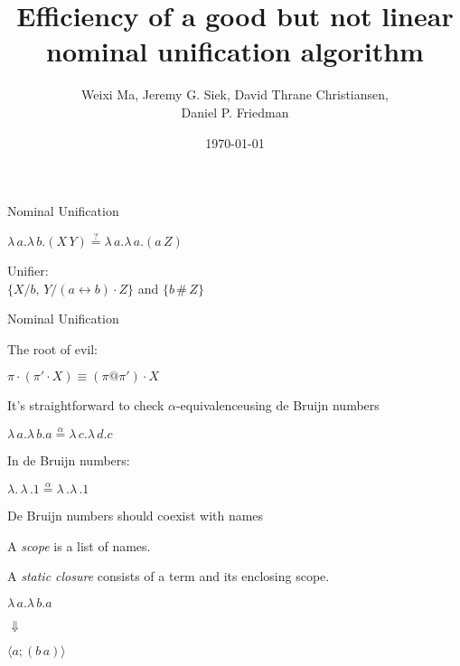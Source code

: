 \documentclass[pdf]{beamer}
\date{\today}
\title{Efficiency of a good but not linear nominal unification algorithm}
\author{Weixi Ma, Jeremy G. Siek, David Thrane Christiansen,\\ Daniel P. Friedman}
\newcommand{\bd}[2] {
 #1/ #2
}
\newcommand{\clos}[2] {
\langle #1; #2 \rangle
}
\newcommand{\swap}[2] {
  #1\leftrightarrow#2
}
\newcommand{\alphaeq}[2] {
  #1\stackrel{\alpha}{=}#2
}
\begin{document}


\begin{frame}
  \maketitle
\end{frame}

\begin{frame}{Nominal Unification~\citep{urban_nominal_2004}}
  
  {\centering
    $\lambda\,a.\lambda\,b.(X\, Y) \stackrel{?}{=} \lambda\,a.\lambda\,a.(a\,Z)$
    \par}
  \vspace{1cm}
  {\centering
    Unifier:\\
    $\{\bd{X}{b},\,\bd{Y}{(\swap{a}{b})\cdot Z}\}$ and $\{b\,\#\,Z\}$
    \par}
\end{frame}

\begin{frame}{Nominal Unification~\citep{urban_nominal_2004}}

  {\centering
  The root of evil:
  \par}
  {\centering
    $\pi\cdot(\pi'\cdot X) \equiv (\pi@\pi')\cdot X$
  \par}
\end{frame}

\begin{frame}{It's straightforward to check $\alpha$-equivalence}{using de Bruijn numbers~\citep{de_bruijn_lambda_1972}}
 
 {\centering
   $\alphaeq{\lambda\,a.\lambda\,b.a}{\lambda\,c.\lambda\,d.c}$
 \par}
\vspace{1cm}
  {\centering
  In de Bruijn numbers:\par}
 {\centering
   $\alphaeq{\lambda.\,\lambda\,.1}{\lambda\,.\lambda\,.1}$
 \par}
\end{frame}

\begin{frame}{De Bruijn numbers should coexist with names}

  {\centering
    A \emph{scope} is a list of names.
  \par}
  {\centering
    A \emph{static closure} consists of a term and its enclosing scope. \\
  \par}
  \vspace{1cm}
  
  {\centering $\lambda\,a.\lambda\,b.a$
  \par}

{\centering
  $\Downarrow$
\par}
{\centering
$\clos{a}{(b\,a)}$
\par}
\end{frame}
\end{document}

